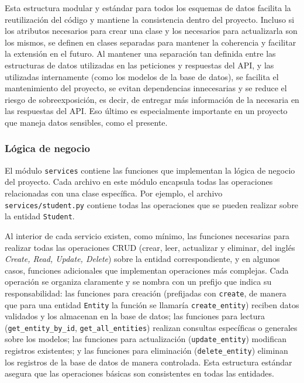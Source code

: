 Esta estructura modular y estándar para todos los esquemas de datos facilita la reutilización del código y mantiene la consistencia dentro del proyecto. Incluso si los atributos necesarios para crear una clase y los necesarios para actualizarla son los mismos, se definen en clases separadas para mantener la coherencia y facilitar la extensión en el futuro. Al mantener una separación tan definida entre las estructuras de datos utilizadas en las peticiones y respuestas del \gls{API}, y las utilizadas internamente (como los modelos de la base de datos), se facilita el mantenimiento del proyecto, se evitan dependencias innecesarias y se reduce el riesgo de \gls{sobreexposición}, es decir, de entregar más información de la necesaria en las respuestas del \gls{API}. Eso último es especialmente importante en un proyecto que maneja datos sensibles, como el presente.

\subsubsection{Lógica de negocio}

El módulo \texttt{services} contiene las funciones que implementan la lógica de negocio del proyecto. Cada archivo en este módulo encapsula todas las operaciones relacionadas con una clase específica. Por ejemplo, el archivo \texttt{services/student.py} contiene todas las operaciones que se pueden realizar sobre la entidad \texttt{Student}.

Al interior de cada servicio existen, como mínimo, las funciones necesarias para realizar todas las operaciones \gls{CRUD} (crear, leer, actualizar y eliminar, del inglés \textit{Create, Read, Update, Delete}) sobre la entidad correspondiente, y en algunos casos, funciones adicionales que implementan operaciones más complejas. Cada operación se organiza claramente y se nombra con un prefijo que indica su responsabilidad: las funciones para creación (prefijadas con \texttt{create}, de manera que para una entidad \texttt{Entity} la función se llamaría \texttt{create\_entity}) reciben datos validados y los almacenan en la base de datos; las funciones para lectura (\texttt{get\_entity\_by\_id}, \texttt{get\_all\_entities}) realizan consultas específicas o generales sobre los modelos; las funciones para actualización (\texttt{update\_entity}) modifican registros existentes; y las funciones para eliminación (\texttt{delete\_entity}) eliminan los registros de la base de datos de manera controlada. Esta estructura estándar asegura que las operaciones básicas son consistentes en todas las entidades.

